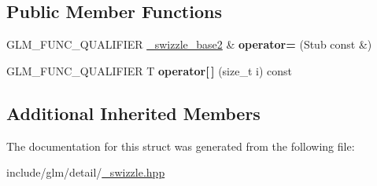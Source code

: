 \subsection*{Public Member Functions}
\begin{DoxyCompactItemize}
\item 
\mbox{\label{structglm_1_1detail_1_1__swizzle__base2_3_01N_00_01T_00_01P_00_01vecType_00_01E0_00_01E1_00_01E2_00_01E3_00_011_01_4_aefe588f8e3fc72f6be6350ba9524ae93}} 
G\+L\+M\+\_\+\+F\+U\+N\+C\+\_\+\+Q\+U\+A\+L\+I\+F\+I\+ER \hyperlink{structglm_1_1detail_1_1__swizzle__base2}{\+\_\+swizzle\+\_\+base2} \& {\bfseries operator=} (Stub const \&)
\item 
\mbox{\label{structglm_1_1detail_1_1__swizzle__base2_3_01N_00_01T_00_01P_00_01vecType_00_01E0_00_01E1_00_01E2_00_01E3_00_011_01_4_ad3ffb03de9a95ef467776571f51d40e7}} 
G\+L\+M\+\_\+\+F\+U\+N\+C\+\_\+\+Q\+U\+A\+L\+I\+F\+I\+ER T {\bfseries operator\mbox{[}$\,$\mbox{]}} (size\+\_\+t i) const
\end{DoxyCompactItemize}
\subsection*{Additional Inherited Members}


The documentation for this struct was generated from the following file\+:\begin{DoxyCompactItemize}
\item 
include/glm/detail/\hyperlink{__swizzle_8hpp}{\+\_\+swizzle.\+hpp}\end{DoxyCompactItemize}
